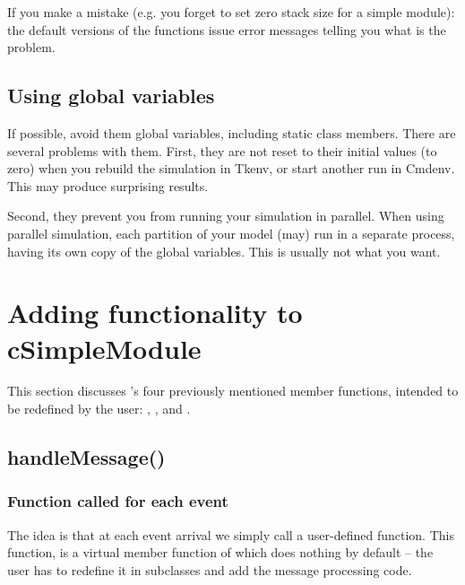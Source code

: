 If you make a mistake (e.g. you forget to set zero stack size
 for a 
simple module): the default versions of the
functions issue error messages telling you what is the problem.



\subsection{Using global variables}

If possible, avoid them global variables, including
static class members. There are several problems with them.
First, they are not reset to their initial values (to zero)
when you rebuild the simulation in Tkenv, or start another run
in Cmdenv. This may produce surprising results.

Second, they prevent you from running your simulation in parallel.
When using parallel simulation, each partition of your model
(may) run in a separate process, having its own copy of the
global variables. This is usually not what you want.




\section{Adding functionality to cSimpleModule}

This section discusses 's four previously
mentioned member functions, intended to be redefined by the user:
, , 
and .




\subsection{handleMessage()}

\subsubsection{Function called for each event}


The idea is that at each event arrival we simply call a
user-defined function. This function,
 is a
virtual member function of  which does
nothing by default -- the user has to redefine it in subclasses
and add the message processing code.

